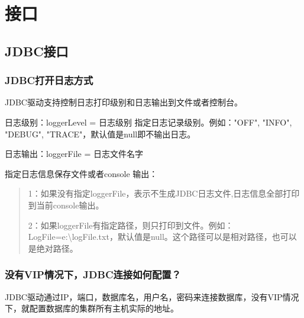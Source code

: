 \documentclass[letterpaper,10pt,english]{sphinxmanual}
\begin{document}
\begin{sphinxVerbatim}[commandchars=\\\{\}]
\end{sphinxVerbatim}


\chapter{接口}
\label{\detokenize{interface:id1}}\label{\detokenize{interface::doc}}

\section{JDBC接口}
\label{\detokenize{interface/jdbc:jdbc}}\label{\detokenize{interface/jdbc::doc}}

\subsection{JDBC打开日志方式}
\label{\detokenize{interface/jdbc:id1}}
JDBC驱动支持控制日志打印级别和日志输出到文件或者控制台。

日志级别：loggerLevel = 日志级别  指定日志记录级别。例如："OFF", "INFO", "DEBUG", "TRACE"，默认值是null即不输出日志。

日志输出：loggerFile = 日志文件名字

指定日志信息保存文件或者console 输出：
\begin{quote}

1：如果没有指定loggerFile，表示不生成JDBC日志文件,日志信息全部打印到当前console输出。

2：如果loggerFile有指定路径，则只打印到文件。例如：LogFile=e:\textbackslash{}logFile.txt，默认值是null。这个路径可以是相对路径，也可以是绝对路径。
\end{quote}


\subsection{没有VIP情况下，JDBC连接如何配置？}
\label{\detokenize{interface/jdbc:vip-jdbc}}
JDBC驱动通过IP，端口，数据库名，用户名，密码来连接数据库，没有VIP情况下，就配置数据库的集群所有主机实际的地址。
\end{document}
